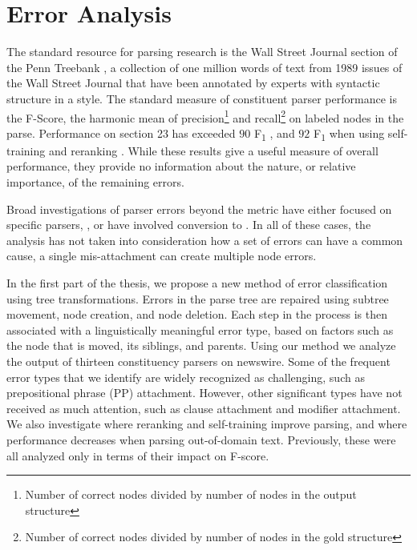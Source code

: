 \section{Error Analysis}

The standard resource for parsing research is the Wall Street Journal section of the Penn Treebank \parencite{ptb}, a collection of one million words of text from 1989 issues of the Wall Street Journal that have been annotated by experts with syntactic structure in a \gb style.
The standard measure of constituent parser performance is the F-Score, the harmonic mean of precision\footnote{Number of correct nodes divided by number of nodes in the output structure} and recall\footnote{Number of correct nodes divided by number of nodes in the gold structure}  on labeled nodes in the parse.
Performance on \wsj section 23 has exceeded $90$ F\textsubscript{1} \parencite{Petrov-Klein:2007}, and $92$ F\textsubscript{1} when using self-training and reranking \parencite{McClosky-Charniak-Johnson:2006,Charniak-Johnson:2005}. 
While these results give a useful measure of overall performance, they provide no information about the nature, or relative importance, of the remaining errors.

Broad investigations of parser errors beyond the \parseval metric \parencite{Black-etal:1991} have either focused on specific parsers, \myeg \parencite{Collins:2003}, or have involved conversion to \depgr \parencite{Carroll-etal:1998,King:2003}.
In all of these cases, the analysis has not taken into consideration how a set of errors can have a common cause, \myeg a single mis-attachment can create multiple node errors.

In the first part of the thesis, we propose a new method of error classification using tree transformations.
Errors in the parse tree are repaired using subtree movement, node creation, and node deletion.
Each step in the process is then associated with a linguistically meaningful error type, based on factors such as the node that is moved, its siblings, and parents.  
Using our method we analyze the output of thirteen constituency parsers on newswire.
Some of the frequent error types that we identify are widely recognized as challenging, such as prepositional phrase (PP) attachment.
However, other significant types have not received as much attention, such as clause attachment and modifier attachment.
We also investigate where reranking and self-training improve parsing, and where performance decreases when parsing out-of-domain text.
Previously, these were all analyzed only in terms of their impact on F-score.


